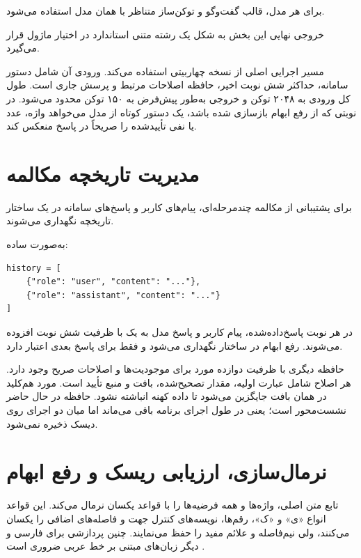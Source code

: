 برای هر مدل، قالب گفت‌وگو و توکن‌ساز متناظر با همان مدل
استفاده می‌شود.

خروجی نهایی این بخش به شکل یک رشته متنی استاندارد در اختیار
ماژول  قرار می‌گیرد.

مسیر اجرایی اصلی از نسخه چهاربیتی 
استفاده می‌کند. ورودی آن شامل دستور سامانه، حداکثر شش نوبت
اخیر، حافظه اصلاحات مرتبط و پرسش جاری است. طول کل ورودی به
۲۰۴۸ توکن و خروجی به‌طور پیش‌فرض به ۱۵۰ توکن محدود می‌شود.
در نوبتی که از رفع ابهام بازسازی شده باشد، یک دستور کوتاه از
مدل می‌خواهد واژه، عدد یا نفی تأییدشده را صریحاً در پاسخ منعکس
کند.


\section{مدیریت تاریخچه مکالمه}

برای پشتیبانی از مکالمه چندمرحله‌ای، پیام‌های کاربر و پاسخ‌های
سامانه در یک ساختار تاریخچه نگهداری می‌شوند.

به‌صورت ساده:

\begin{latin}\begin{verbatim}
history = [
    {"role": "user", "content": "..."},
    {"role": "assistant", "content": "..."}
]
\end{verbatim}\end{latin}

در هر نوبت پاسخ‌داده‌شده، پیام کاربر و پاسخ مدل به یک
 با ظرفیت شش نوبت افزوده می‌شوند. رفع ابهام در ساختار
 نگهداری می‌شود و فقط برای پاسخ بعدی
اعتبار دارد.

حافظه دیگری با ظرفیت دوازده مورد برای موجودیت‌ها و اصلاحات
صریح وجود دارد. هر اصلاح شامل عبارت اولیه، مقدار تصحیح‌شده،
بافت و منبع تأیید است. مورد هم‌کلید در همان بافت جایگزین می‌شود
تا داده کهنه انباشته نشود. حافظه در حال حاضر نشست‌محور است؛ یعنی
در طول اجرای برنامه باقی می‌ماند اما میان دو اجرای 
روی دیسک ذخیره نمی‌شود.


\section{نرمال‌سازی، ارزیابی ریسک و رفع ابهام}

تابع  متن اصلی، واژه‌ها و همه
فرضیه‌ها را با قواعد یکسان نرمال می‌کند. این قواعد انواع «ی» و
«ک»، رقم‌ها، نویسه‌های کنترل جهت و فاصله‌های اضافی را یکسان
می‌کنند، ولی نیم‌فاصله و علائم مفید را حفظ می‌نمایند. چنین
پردازشی برای فارسی و دیگر زبان‌های مبتنی بر خط عربی ضروری است
\cite{mohtaj2018parsivar}.

